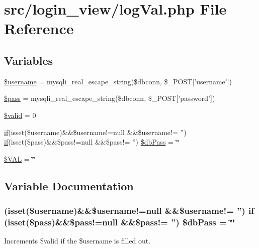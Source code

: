 \hypertarget{logVal_8php}{\section{src/login\-\_\-view/log\-Val.php \-File \-Reference}
\label{logVal_8php}
}
\subsection*{\-Variables}
\begin{DoxyCompactItemize}
\item 
\hyperlink{logVal_8php_a0eb82aa5f81cf845de4b36cd653c42cf}{\$username} = mysqli\-\_\-real\-\_\-escape\-\_\-string(\$dbconn, \$\-\_\-\-P\-O\-S\-T\mbox{[}'username'\mbox{]})
\item 
\hyperlink{logVal_8php_a12ec2780b52bd1c54d38c2f981c0349f}{\$pass} = mysqli\-\_\-real\-\_\-escape\-\_\-string(\$dbconn, \$\-\_\-\-P\-O\-S\-T\mbox{[}'password'\mbox{]})
\item 
\hyperlink{logVal_8php_a0587674d27d00ef497e08e53ccf45bbb}{\$valid} = 0
\item 
\hyperlink{updateBenchDB_8php_a0c1f2915e12defa9f4d515347d884dee}{if}(isset(\$username)\&\&\$username!=null \*
\&\&\$username!= '') \hyperlink{updateBenchDB_8php_a0c1f2915e12defa9f4d515347d884dee}{if}(isset(\$pass)\&\&\$pass!=null \*
\&\&\$pass!= '') \hyperlink{logVal_8php_ab62c76ac070a71dc45fb561a8ed2b5c0}{\$db\-Pass} = \char`\"{}\char`\"{}
\item 
\hyperlink{logVal_8php_afac416adadad464e183a45b802cd7f8a}{\$\-V\-A\-L} = \char`\"{}\char`\"{}
\end{DoxyCompactItemize}


\subsection{\-Variable \-Documentation}
\hypertarget{logVal_8php_ab62c76ac070a71dc45fb561a8ed2b5c0}{
\subsubsection[{\$db\-Pass}]{ (isset(\$username)\&\&\$username!=null \&\&\$username!= '') {\bf if} (isset(\$pass)\&\&\$pass!=null \&\&\$pass!= '') \$db\-Pass = \char`\"{}\char`\"{}}}\label{logVal_8php_ab62c76ac070a71dc45fb561a8ed2b5c0}
\-Increments \$valid if the \$username is filled out.

